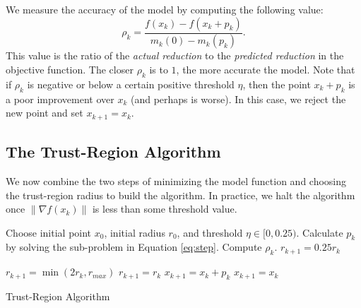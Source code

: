 We measure the accuracy of the model by computing the following value:
\[
\rho_k = \frac{f(x_k)-f(x_k+p_k)}{m_k(0) - m_k(p_k)}.
\]
This value is the ratio of the \emph{actual reduction} to the \emph{predicted reduction} in the objective function. The closer
$\rho_k$ is to $1$, the more accurate the model.
Note that if $\rho_k$ is negative or below a certain positive threshold $\eta$,
then the point $x_k+p_k$ is a poor improvement over $x_k$ (and perhaps is worse).
In this case, we reject the new point and set $x_{k+1} = x_k$.

\subsection*{The Trust-Region Algorithm}
We now combine the two steps of minimizing the model function and choosing the trust-region radius to build the algorithm.  In practice, we halt the algorithm once $\|\nabla f(x_k)\|$ is less than some threshold value.
\begin{algorithm}
\begin{algorithmic}[1]
    \State Choose initial point $x_0$, initial radius $r_0$, and threshold $\eta \in [0,0.25)$.
        \State Calculate $p_k$ by solving the sub-problem in Equation \ref{eq:step}.
        \State Compute $\rho_k$.
            \State $r_{k+1} = 0.25r_k$

        \Else
                \State $r_{k+1} = \min(2r_k, r_{max})$
            \Else
                \State $r_{k+1} = r_k$
            \EndIf
        \EndIf
            \State $x_{k+1} = x_k + p_k$
        \Else
            \State $x_{k+1} = x_k$
        \EndIf
    \EndWhile
\EndProcedure
\end{algorithmic}
\caption{Trust-Region Algorithm}
\label{alg:trustregion}
\end{algorithm}

